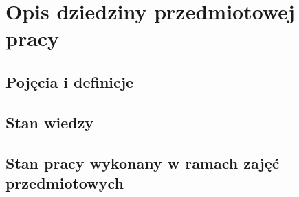 % 
\newpage\section{Opis dziedziny przedmiotowej pracy}\label{sec:dziedzina}
\subsection{Pojęcia i definicje}
\subsection{Stan wiedzy}
\subsection{Stan pracy wykonany w ramach zajęć \newline przedmiotowych} 
